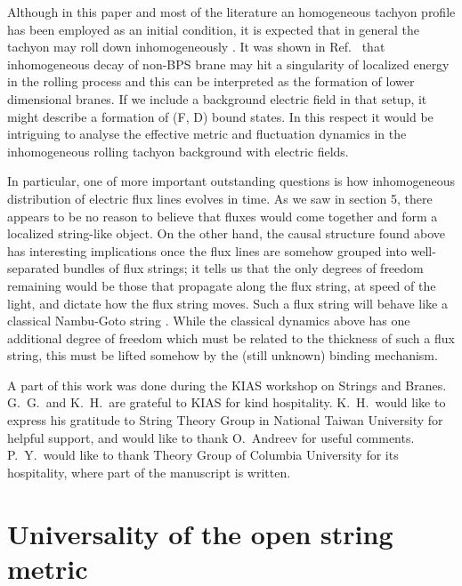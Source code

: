 \documentclass[a4paper,12pt]{article}
\begin{document}
Although in this paper and most of the literature an 
homogeneous tachyon profile has been employed as an initial condition, 
it is expected that in general the tachyon may roll down
inhomogeneously \cite{inhomo}.  It was shown in Ref.\ \cite{time} 
that inhomogeneous decay of non-BPS brane may hit a singularity of
localized energy in the
rolling process and this can be interpreted as the  formation of lower
dimensional branes. If we include a background electric field in
that setup, it might describe a formation of 
(F, D) bound states. In this respect it would be intriguing to analyse
the effective metric and fluctuation dynamics in the inhomogeneous
rolling tachyon background with electric fields. 

In particular, one of more important outstanding questions is how
inhomogeneous distribution of electric flux lines evolves in time. As we
saw in section 5, there appears to be no reason to believe that fluxes
would come together and form a localized string-like object. On the
other hand, the causal structure found above has interesting
implications once the flux lines are somehow grouped into well-separated
bundles of flux strings; it tells us that the only degrees of freedom
remaining would be those that propagate along the flux string, at speed
of the light, and dictate how the flux string moves. Such a flux string
will behave like a classical Nambu-Goto string \cite{fluid}. While the
classical dynamics above has one additional degree of freedom which
must be related to the thickness of such a flux string, this must be lifted
somehow by the (still unknown) binding mechanism. 

\vskip 1cm

\noindent
{}
\vskip 0.5cm \noindent
A part of this work was done during the KIAS workshop on Strings
and Branes.  G.\ G.\ and K.\ H.\ are grateful to KIAS for kind
hospitality. K.\ H.\ would like to express his gratitude to 
String Theory Group in National Taiwan University for helpful 
support, and would like to thank O.\ Andreev for useful
comments. P.\ Y.\ would like to thank Theory Group of Columbia
University for its hospitality, where part of the manuscript is
written. 


\vskip 1cm
\appendix

\section{Universality of the open string metric}
\end{document}
